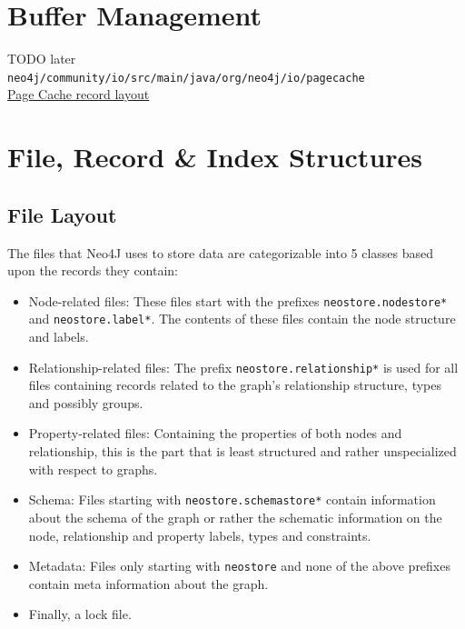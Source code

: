 \documentclass[a4paper,10pt]{article}
\begin{document}
    \newpage

 
\section{Buffer Management}
    TODO later \\
    \texttt{neo4j/community/io/src/main/java/org/neo4j/io/pagecache} \\
    \href{https://www.slideshare.net/thobe/an-overview-of-neo4j-internals}{Page Cache record layout} \\

    \newpage
 

\section{File, Record \& Index Structures}\label{structure}
    \subsection{File Layout}\label{files_sec}
        The files that Neo4J uses to store data are categorizable into 5 classes based upon the records they contain:
        \begin{itemize}
            \item Node-related files: These files start with the prefixes \texttt{neostore.nodestore*} and \texttt{neostore.label*}. 
                The contents of these files contain the node structure and labels. 
            \item Relationship-related files: The prefix \texttt{neostore.relationship*} is used for all files containing records related to the graph's relationship structure, types and possibly groups.
            \item Property-related files: Containing the properties of both nodes and relationship, this is the part that is least structured and rather unspecialized with respect to graphs.
            \item Schema: Files starting with \texttt{neostore.schemastore*} contain information about the schema of the graph or rather the schematic information on the node, relationship and property labels, types and constraints.
            \item Metadata: Files only starting with \texttt{neostore} and none of the above prefixes contain meta information about the graph.
            \item Finally, a lock file.
        \end{itemize}
        
\end{document}
